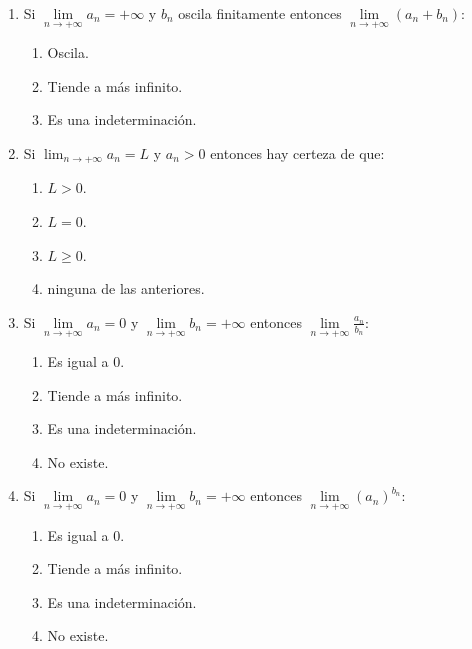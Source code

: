 \documentclass{article}
\newcommand{\limninf}{\lim_{n \rightarrow +\infty}}
\newcommand{\limninfs}{\lim\limits_{n \rightarrow +\infty}}
\begin{document}
\begin{enumerate}[label=(\alph*)]

\item Si $ \limninfs a_n = +\infty $ y $ b_n $ oscila finitamente entonces $ \limninfs (a_n + b_n) $:

\begin{enumerate}[label=\textbf{(\roman*)}]

\item Oscila.

\item Tiende a más infinito.

\item Es una indeterminación.

\end{enumerate}

\item Si $ \limninf a_n = L $ y $ a_n > 0 $ entonces hay certeza de que:

\begin{enumerate}[label=\textbf{(\roman*)}]

\item $ L > 0 $.

\item $ L = 0 $.

\item $ L \geq 0 $.

\item ninguna de las anteriores.

\end{enumerate}

\item Si $ \limninfs a_n = 0 $ y $ \limninfs b_n = +\infty $ entonces $ \limninfs \frac{a_n}{b_n} $:

\begin{enumerate}[label=\textbf{(\roman*)}]

\item Es igual a 0.

\item Tiende a más infinito.

\item Es una indeterminación.

\item No existe.

\end{enumerate}

\item Si $ \limninfs a_n = 0 $ y $ \limninfs b_n = +\infty $ entonces $ \limninfs {(a_n)}^{b_n} $:

\begin{enumerate}[label=\textbf{(\roman*)}]

\item Es igual a 0.

\item Tiende a más infinito.

\item Es una indeterminación.

\item No existe.

\end{enumerate}

\end{enumerate}
\end{document}
